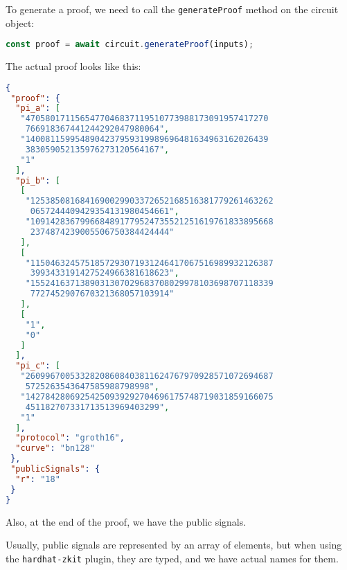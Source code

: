 \documentclass[../lecture-notes.tex]{subfiles}
\begin{document}
    To generate a proof, we need to call the \texttt{generateProof} method on the circuit object:

    \begin{lstlisting}[language=TypeScript,numbers=none]
    const proof = await circuit.generateProof(inputs);
    \end{lstlisting}

    The actual proof looks like this:
    \begin{center}
        \begin{tcolorbox}[enhanced,
            width=0.925\textwidth,
            title=\textbf{proof.json},
            coltitle=gray!25!black,
            attach boxed title to top center={yshift=-2mm,yshifttext=-1mm},
            boxed title style={size=small,colframe=gray!75!black,
            colback=purple!30!white,boxrule=1pt},
            top=-0.35cm,
            bottom=-0.35cm]
            \begin{lstlisting}[language=JSON,numbers=none,basicstyle=\ttfamily\scriptsize]
{
 "proof": {
  "pi_a": [
   "4705801711565477046837119510773988173091957417270
    766918367441244292047980064",
   "1400811599548904237959319989696481634963162026439
    383059052135976273120564167",
   "1"
  ],
  "pi_b": [
   [
    "1253850816841690029903372652168516381779261463262
     0657244409429354131980454661",
    "1091428367996684891779524735521251619761833895668
     2374874239005506750384424444"
   ],
   [
    "1150463245751857293071931246417067516989932126387
     3993433191427524966381618623",
    "1552416371389031307029683708029978103698707118339
     7727452907670321368057103914"
   ],
   [
    "1",
    "0"
   ]
  ],
  "pi_c": [
   "26099670053328208608403811624767970928571072694687
    5725263543647585988798998",
   "14278428069254250939292704696175748719031859166075
    451182707331713513969403299",
   "1"
  ],
  "protocol": "groth16",
  "curve": "bn128"
 },
 "publicSignals": {
  "r": "18"
 }
}
            \end{lstlisting}
        \end{tcolorbox}
    \end{center}

    Also, at the end of the proof, we have the public signals.

    \begin{remark}
        Usually, public signals are represented by an array of elements, but when using the \texttt{hardhat-zkit} plugin,
        they are typed, and we have actual names for them.
    \end{remark}
\end{document}
